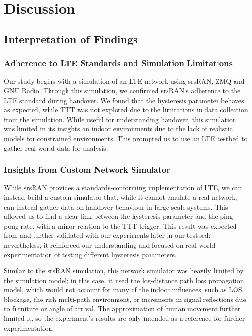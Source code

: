 \chapter{Discussion}

\section{Interpretation of Findings}
\subsection{Adherence to LTE Standards and Simulation Limitations}
Our study begins with a simulation of an LTE network using srsRAN, ZMQ and GNU Radio. Through this simulation, we confirmed srsRAN's adherence to the LTE standard during handover. We found that the hysteresis parameter behaves as expected, while TTT was not explored due to the limitations in data collection from the simulation. While useful for understanding handover, this simulation was limited in its insights on indoor environments due to the lack of realistic models for constrained environments. This prompted us to use an LTE testbed to gather real-world data for analysis.

\subsection{Insights from Custom Network Simulator}
While srsRAN provides a standards-conforming implementation of LTE, we can instead build a custom simulator that, while it cannot emulate a real network, can instead gather data on handover behaviour in large-scale systems. This allowed us to find a clear link between the hysteresis parameter and the ping-pong rate, with a minor relation to the TTT trigger. This result was expected from \citet{hatipoglu_handover-based_2020} and further validated with our experiments later in our testbed; nevertheless, it reinforced our understanding and focused on real-world experimentation of testing different hysteresis parameters.

Similar to the srsRAN simulation, this network simulator was heavily limited by the simulation model; in this case, it used the log-distance path loss propagation model, which would not account for many of the indoor influences, such as LOS blockage, the rich multi-path environment, or increments in signal reflections due to furniture or angle of arrival. The approximation of human movement further limited it, so the experiment's results are only intended as a reference for further experimentation.


